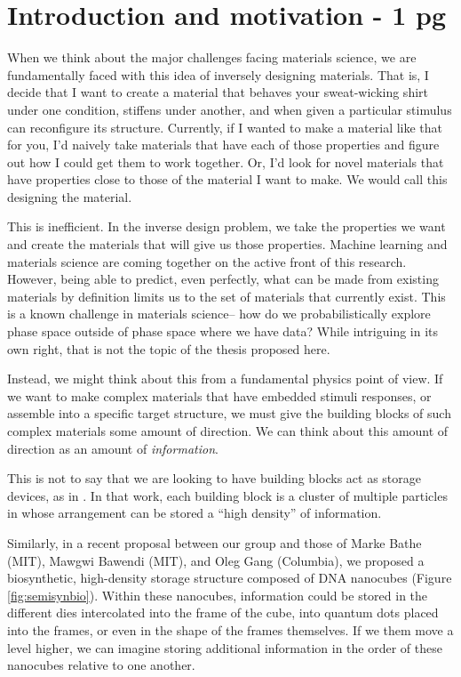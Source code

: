 \section{Introduction and motivation - 1 pg}

When we think about the major challenges facing materials science, we are fundamentally faced with this idea of inversely designing materials.
That is, I decide that I want to create a material that behaves your sweat-wicking shirt under one condition, stiffens under another, and when given a particular stimulus can reconfigure its structure.
Currently, if I wanted to make a material like that for you, I'd naively take materials that have each of those properties and figure out how I could get them to work together.
Or, I'd look for novel materials that have properties close to those of the material I want to make.
We would call this designing the material.

This is inefficient.
In the inverse design problem, we take the properties we want and create the materials that will give us those properties.
Machine learning and materials science are coming together on the active front of this research.
However, being able to predict, even perfectly, what can be made from existing materials by definition limits us to the set of materials that currently exist.
This is a known challenge in materials science-- how do we probabilistically explore phase space outside of phase space where we have data?
While intriguing in its own right, that is not the topic of the thesis proposed here.

Instead, we might think about this from a fundamental physics point of view.
If we want to make complex materials that have embedded stimuli responses, or assemble into a specific target structure, we must give the building blocks of such complex materials some amount of direction.
We can think about this amount of direction as an amount of \textit{information}.

This is not to say that we are looking to have building blocks act as storage devices, as in \cite{Phillips_2014_SoftMatter}.
In that work, each building block is a cluster of multiple particles in whose arrangement can be stored a ``high density'' of information.

Similarly, in a recent proposal between our group and those of Marke Bathe (MIT), Mawgwi Bawendi (MIT), and Oleg Gang (Columbia), we proposed a biosynthetic, high-density storage structure composed of DNA nanocubes (Figure \ref{fig:semisynbio}).
Within these nanocubes, information could be stored in the different dies intercolated into the frame of the cube, into quantum dots placed into the frames, or even in the shape of the frames themselves.
If we them move a level higher, we can imagine storing additional information in the order of these nanocubes relative to one another.

